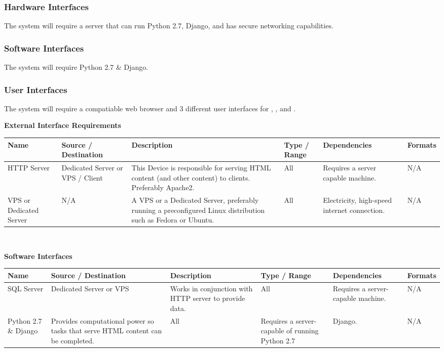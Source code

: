\documentclass[12pt]{report}
\begin{document}
  \subsubsection{Hardware Interfaces}
   The system will require a server that can run Python 2.7, Django, and has secure networking capabilities.
  \subsubsection{Software Interfaces}
   The system will require Python 2.7 \& Django.
  \subsubsection{User Interfaces}
   The system will require a compatiable web browser and 3 different user interfaces for , , and .
   \newpage
   {\centering \textbf{External Interface Requirements} \\[0.1cm]
   \begin{tabular}{| p{2cm} | p{2cm} | p{5cm} | p{2cm} | p{2.8cm} | p{1.6cm} |}
    \hline
     \textbf{Name} & \textbf{Source / Destination} & \textbf{Description} & \textbf{Type / Range} & \textbf{Dependencies} & \textbf{Formats} \\ \hline
     HTTP Server & Dedicated Server or VPS / Client & This Device is responsible for serving HTML content (and other content) to clients. Preferably Apache2. & All & Requires a server capable machine. & N/A \\ \hline
     VPS or Dedicated Server & N/A & A VPS or a Dedicated Server, preferably running a preconfigured Linux distribution such as Fedora or Ubuntu. & All & Electricity, high-speed internet connection. & N/A \\ \hline
   \end{tabular}\\[0.1cm]}
   {\centering \textbf{Software Interfaces} \\[0.1cm]
   \begin{tabular}{| p{2cm} | p{2cm} | p{5cm} | p{2cm} | p{2.8cm} | p{1.6cm} |}
    \hline
     \textbf{Name} & \textbf{Source / Destination} & \textbf{Description} & \textbf{Type / Range} & \textbf{Dependencies} & \textbf{Formats} \\ \hline
     SQL Server & Dedicated Server or VPS & Works in conjunction with HTTP server to provide data. & All & Requires a server-capable machine. & N/A \\ \hline
     Python 2.7 \& Django & Provides computational power so tasks that serve HTML content can be completed. & All & Requires a server-capable of running Python 2.7 & Django. & N/A \\ \hline
   \end{tabular}\\[0.1cm]}
\end{document}
